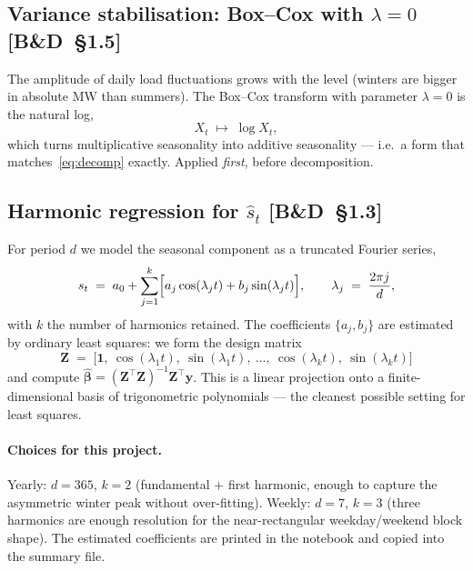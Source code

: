 \documentclass[11pt,a4paper]{article}
\newcommand{\BD}[1]{\textsc{[B\&D~§#1]}}
\begin{document}
\subsection*{Variance stabilisation: Box--Cox with $\lambda = 0$ \BD{1.5}}
The amplitude of daily load fluctuations grows with the level (winters are bigger
in absolute MW than summers). The Box--Cox transform with parameter $\lambda = 0$
is the natural log,
\begin{equation}
X_t \;\longmapsto\; \log X_t,
\end{equation}
which turns multiplicative seasonality into additive seasonality --- i.e.\ a form
that matches~\eqref{eq:decomp} exactly. Applied \emph{first}, before decomposition.

\subsection*{Harmonic regression for $\hat s_t$ \BD{1.3}}
For period $d$ we model the seasonal component as a truncated Fourier series,
\begin{equation}
s_t \;=\; a_0 + \sum_{j=1}^{k}\Bigl[a_j \cos(\lambda_j t) + b_j \sin(\lambda_j t)\Bigr],
\qquad \lambda_j \;=\; \frac{2\pi j}{d},
\label{eq:harmonic}
\end{equation}
with $k$ the number of harmonics retained. The coefficients $\{a_j, b_j\}$ are
estimated by ordinary least squares: we form the design matrix
\begin{equation}
\mathbf{Z} \;=\; \bigl[\mathbf{1},\ \cos(\lambda_1 t),\ \sin(\lambda_1 t),\ \ldots,\ \cos(\lambda_k t),\ \sin(\lambda_k t)\bigr]
\end{equation}
and compute $\hat{\boldsymbol\beta} = (\mathbf{Z}^\top \mathbf{Z})^{-1} \mathbf{Z}^\top \mathbf{y}$.
This is a linear projection onto a finite-dimensional basis of trigonometric
polynomials --- the cleanest possible setting for least squares.

\paragraph{Choices for this project.}
Yearly: $d = 365$, $k = 2$ (fundamental + first harmonic, enough to capture the
asymmetric winter peak without over-fitting).  Weekly: $d = 7$, $k = 3$
(three harmonics are enough resolution for the near-rectangular weekday/weekend
block shape). The estimated coefficients are printed in the notebook and copied
into the summary file.
\end{document}
